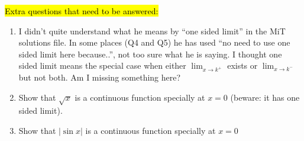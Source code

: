 \documentclass[]{article}
\DeclareRobustCommand{\hlred}[1]{{\sethlcolor{red}\hl{#1}}}
\begin{document}
\hlred{Extra questions that need to be answered:}
\begin{enumerate}
	\item I didn't quite understand what he means by ``one sided limit'' in the MiT solutions file. In some places (Q4 and Q5) he has used ``no need to use one sided limit here because..'', not too sure what he is saying. I thought one sided limit means the special case when either $\lim_{x\to k^{+}}$ exists or $\lim_{x\to k^{-}}$ but not both. Am I missing something here?
	
	\item Show that $\sqrt{x}$ is a continuous function specially at $x=0$ (beware: it has one sided limit).
	
	\item Show that $|\sin{x}|$ is a continuous function specially at $x=0$ 
	
	
\end{enumerate}
\end{document}
